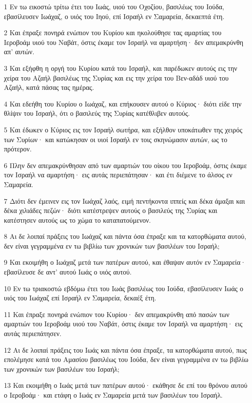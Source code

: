 \par 1 Εν τω εικοστώ τρίτω έτει του Ιωάς, υιού του Οχοζίου, βασιλέως του Ιούδα, εβασίλευσεν Ιωάχαζ, ο υιός του Ιηού, επί Ισραήλ εν Σαμαρεία, δεκαεπτά έτη.
\par 2 Και έπραξε πονηρά ενώπιον του Κυρίου και ηκολούθησε τας αμαρτίας του Ιεροβοάμ υιού του Ναβάτ, όστις έκαμε τον Ισραήλ να αμαρτήση· δεν απεμακρύνθη απ' αυτών.
\par 3 Και εξήφθη η οργή του Κυρίου κατά του Ισραήλ, και παρέδωκεν αυτούς εις την χείρα του Αζαήλ βασιλέως της Συρίας και εις την χείρα του Βεν-αδάδ υιού του Αζαήλ, κατά πάσας τας ημέρας.
\par 4 Και εδεήθη του Κυρίου ο Ιωάχαζ, και επήκουσεν αυτού ο Κύριος· διότι είδε την θλίψιν του Ισραήλ, ότι ο βασιλεύς της Συρίας κατέθλιβεν αυτούς.
\par 5 Και έδωκεν ο Κύριος εις τον Ισραήλ σωτήρα, και εξήλθον υποκάτωθεν της χειρός των Συρίων· και κατώκησαν οι υιοί Ισραήλ εν τοις σκηνώμασιν αυτών, ως το πρότερον.
\par 6 Πλην δεν απεμακρύνθησαν από των αμαρτιών του οίκου του Ιεροβοάμ, όστις έκαμε τον Ισραήλ να αμαρτήση· εις αυτάς περιεπάτησαν· και έτι διέμενε το άλσος εν Σαμαρεία.
\par 7 Διότι δεν έμεινεν εις τον Ιωάχαζ λαός, ειμή πεντήκοντα ιππείς και δέκα άμαξαι και δέκα χιλιάδες πεζών· διότι κατέστρεψεν αυτούς ο βασιλεύς της Συρίας και κατέστησεν αυτούς ως το χώμα το καταπατούμενον.
\par 8 Αι δε λοιπαί πράξεις του Ιωάχαζ και πάντα όσα έπραξε και τα κατορθώματα αυτού, δεν είναι γεγραμμένα εν τω βιβλίω των χρονικών των βασιλέων του Ισραήλ;
\par 9 Και εκοιμήθη ο Ιωάχαζ μετά των πατέρων αυτού, και έθαψαν αυτόν εν Σαμαρεία· εβασίλευσε δε αντ' αυτού Ιωάς ο υιός αυτού.
\par 10 Εν τω τριακοστώ εβδόμω έτει του Ιωάς βασιλέως του Ιούδα, εβασίλευσεν Ιωάς ο υιός του Ιωάχαζ επί Ισραήλ εν Σαμαρεία, δεκαέξ έτη.
\par 11 Και έπραξε πονηρά ενώπιον του Κυρίου· δεν απεμακρύνθη από πασών των αμαρτιών του Ιεροβοάμ υιού του Ναβάτ, όστις έκαμε τον Ισραήλ να αμαρτήση· εις αυτάς περιεπάτησεν.
\par 12 Αι δε λοιπαί πράξεις του Ιωάς και πάντα όσα έπραξε, τα κατορθώματα αυτού, πως επολέμησε κατά του Αμασίου βασιλέως του Ιούδα, δεν είναι γεγραμμένα εν τω βιβλίω των χρονικών των βασιλέων του Ισραήλ;
\par 13 Και εκοιμήθη ο Ιωάς μετά των πατέρων αυτού· εκάθησε δε επί του θρόνου αυτού ο Ιεροβοάμ· και ετάφη ο Ιωάς εν Σαμαρεία μετά των βασιλέων του Ισραήλ.
